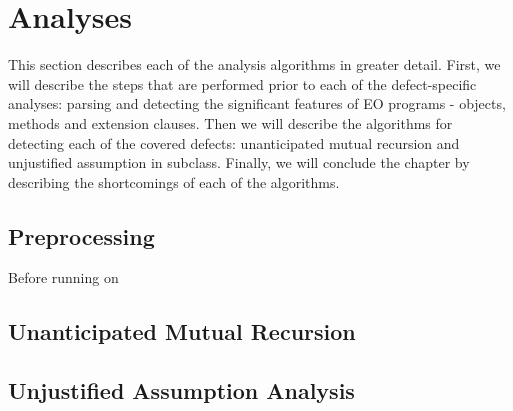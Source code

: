 \section{Analyses}
This section describes each of the analysis algorithms in greater detail. First, we will describe the steps that are performed prior to each of the defect-specific analyses: parsing and detecting the significant features of EO programs - objects, methods and extension clauses. Then we will describe the algorithms for detecting each of the covered defects: unanticipated mutual recursion and unjustified assumption in subclass. Finally, we will conclude the chapter by describing the shortcomings of each of the algorithms.


\subsection{Preprocessing}
Before running on


\subsection{Unanticipated Mutual Recursion}

\subsection{Unjustified Assumption Analysis}


